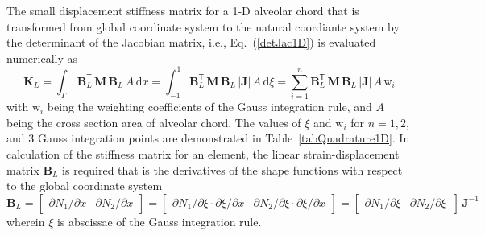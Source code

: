 The small displacement stiffness matrix for a 1-D alveolar chord that is transformed from global coordinate system to the natural coordiante system by the determinant of the Jacobian matrix, i.e., Eq.~(\ref{detJac1D}) is evaluated numerically as 
\begin{equation}
\mathbf{K}_{L} = \int_{\Gamma} \, \mathbf{B}_L^{\mathsf{T}} \, \mathbf{M} \, \mathbf{B}_L \, A \, \mathrm{d} x  = \int_{-1}^{1} \mathbf{B}_L^{\mathsf{T}} \, \mathbf{M} \, \mathbf{B}_L \, |\mathbf{J}|  \, A \,  \mathrm{d} \xi =  \sum_{i=1}^{n}  \mathbf{B}_L^{\mathsf{T}} \, \mathbf{M} \, \mathbf{B}_L \, |\mathbf{J}| \, A \, \mathrm{w}_i
\end{equation}
with $\mathrm{w}_i$ being the  weighting coefficients of the Gauss integration rule, and $A$ being the cross section area of alveolar chord. The values of $\xi$ and $\mathrm{w}_i$ for $n = 1, 2$, and $3$ Gauss integration points are demonstrated in Table~\ref{tabQuadrature1D}.
In calculation of the stiffness matrix for an element, the linear strain-displacement matrix $\mathbf{B}_L$ is required that is the derivatives of the shape functions with respect to the global coordinate system  
\begin{equation}
\mathbf{B}_L = \begin{bmatrix}
\partial N_1 / \partial x &  \partial N_2 / \partial x
\end{bmatrix} = \begin{bmatrix}
\partial N_1 / \partial \xi \cdot \partial \xi / \partial x &  \partial N_2 / \partial \xi \cdot \partial \xi / \partial x
\end{bmatrix} = \begin{bmatrix}
\partial N_1 / \partial \xi &  \partial N_2 / \partial \xi \, 
\end{bmatrix} \, \mathbf{J}^{-1}
\end{equation}
wherein $\xi$ is abscissae of the Gauss integration rule. 

